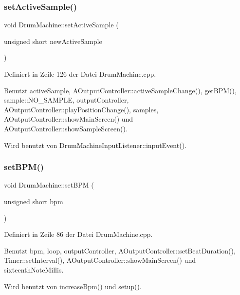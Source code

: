 \subsubsection{\texorpdfstring{set\+Active\+Sample()}{setActiveSample()}}
{\footnotesize\ttfamily void Drum\+Machine\+::set\+Active\+Sample (\begin{DoxyParamCaption}\item[{unsigned short}]{new\+Active\+Sample }\end{DoxyParamCaption})}



Definiert in Zeile 126 der Datei Drum\+Machine.\+cpp.



Benutzt active\+Sample, A\+Output\+Controller\+::active\+Sample\+Change(), get\+B\+P\+M(), sample\+::\+N\+O\+\_\+\+S\+A\+M\+P\+LE, output\+Controller, A\+Output\+Controller\+::play\+Position\+Change(), samples, A\+Output\+Controller\+::show\+Main\+Screen() und A\+Output\+Controller\+::show\+Sample\+Screen().



Wird benutzt von Drum\+Machine\+Input\+Listener\+::input\+Event().

\mbox{\label{class_drum_machine_aaa50ac48ccdbf81a9ed5c7b3e2a5560d}} 
\subsubsection{\texorpdfstring{set\+B\+P\+M()}{setBPM()}}
{\footnotesize\ttfamily void Drum\+Machine\+::set\+B\+PM (\begin{DoxyParamCaption}\item[{unsigned short}]{bpm }\end{DoxyParamCaption})}



Definiert in Zeile 86 der Datei Drum\+Machine.\+cpp.



Benutzt bpm, loop, output\+Controller, A\+Output\+Controller\+::set\+Beat\+Duration(), Timer\+::set\+Interval(), A\+Output\+Controller\+::show\+Main\+Screen() und sixteenth\+Note\+Millis.



Wird benutzt von increase\+Bpm() und setup().

\mbox{\label{class_drum_machine_a2723072af5049c67e990b1eba9351d81}} 
